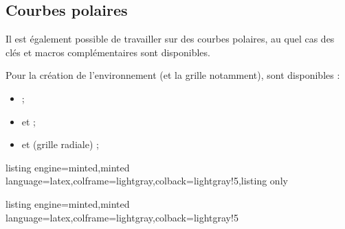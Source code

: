 \documentclass[11pt,a4paper]{ltxdoc}
\begin{document}
\pagebreak

\subsection{Courbes polaires}\label{courbespolaires}

Il est également possible de travailler sur des courbes polaires, au quel cas des clés et macros complémentaires sont disponibles.

\smallskip

Pour la création de l'environnement (et la grille notamment), sont disponibles :

\begin{itemize}
  \item {} ;
  \item {} et  ;
  \item {} et  (grille radiale) ;
\end{itemize}

\begin{tcblisting}{listing engine=minted,minted language=latex,colframe=lightgray,colback=lightgray!5,listing only}
\end{tcblisting}

\begin{tcblisting}{listing engine=minted,minted language=latex,colframe=lightgray,colback=lightgray!5}
\begin{GraphiqueTikz}[Xmin=-1.5,Xmax=2.5,Ymin=-1.5,Ymax=1.5]
  \TracerAxesGrilles[Elargir=2.5mm]{}{} %
\end{GraphiqueTikz}
\begin{GraphiqueTikz}[Xmin=-1.5,Xmax=1.5,Ymin=-1.5,Ymax=1.5]
  \TracerAxesGrilles[Elargir=2.5mm]{}{} %
\end{GraphiqueTikz}
\begin{GraphiqueTikz}%
    [x=0.5cm,y=0.5cm,Xmin=-3,Xmax=3,Ymin=-3,Ymax=3,Rmax=3]
  \TracerAxesGrillePol[Elargir=2.5mm]{}{} %
\end{GraphiqueTikz}
\begin{GraphiqueTikz}[Xmin=-1.5,Xmax=1.5,Ymin=-1.5,Ymax=1.5]
  \TracerAxesGrilles[Elargir=2.5mm]{}{} %
\end{GraphiqueTikz}
\end{tcblisting}
\end{document}
